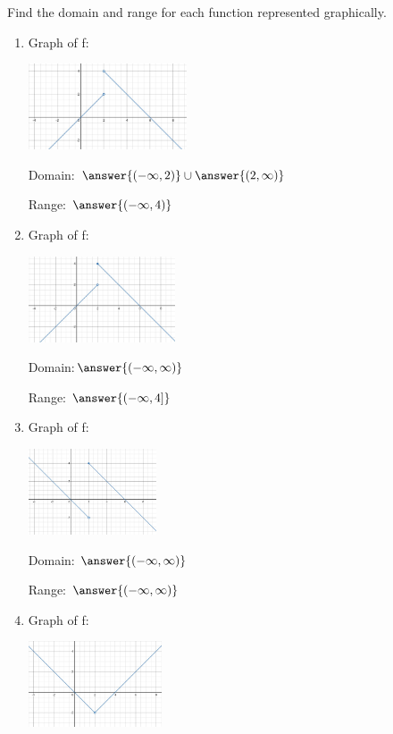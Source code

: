 \documentclass{ximera}
\begin{document}
\begin{problem}\label{prob:160hom2prob3}
Find the domain and range for each function represented graphically.
\begin{enumerate}
    \item Graph of f:
     \begin{image}
   \includegraphics[height=1in]{160H2pic1.jpg}
 \end{image}
 
 Domain: $\answer{(-\infty,2)}\cup\answer{(2,\infty)}$
 
 Range:  $\answer{(-\infty,4)}$
 \item Graph of f:
     \begin{image}
   \includegraphics[height=1in]{160H2pic2.jpg}
 \end{image}
 
 Domain:$\answer{(-\infty,\infty)}$
 
 Range:  $\answer{(-\infty,4]}$
 \item Graph of f:
     \begin{image}
   \includegraphics[height=1in]{160H2pic3.jpg}
 \end{image}
 
 Domain: $\answer{(-\infty,\infty)}$
 
 Range: $\answer{(-\infty,\infty)}$
 \item Graph of f:
     \begin{image}
   \includegraphics[height=1in]{160H2pic4.jpg}
 \end{image}
 

\end{enumerate}
\end{problem}
\end{document}

